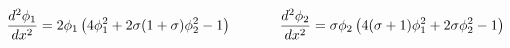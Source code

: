 \begin{equation}
\frac{d^2 \phi_1}{d x^2} = 2 \phi_1 \left(4 \phi_1^2 + 2 \sigma
(1+\sigma) \phi_2^2-1\right) \hspace{1.2cm} \frac{d^2 \phi_2}{d
x^2} = \sigma \phi_2 \left( 4(\sigma+1) \phi_1^2 + 2 \sigma
\phi_2^2-1\right) \label{eq:ecuseg}
\end{equation}

